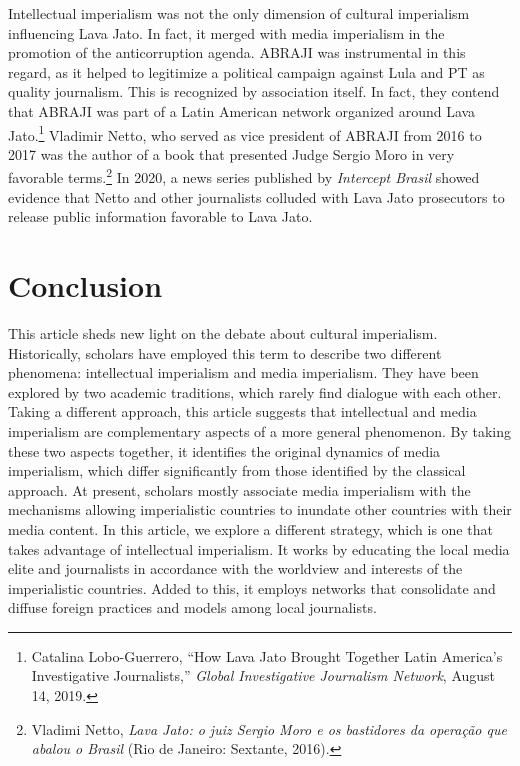 \documentclass{tufte-handout}
\begin{document}
Intellectual imperialism was not the only dimension of cultural
imperialism influencing Lava Jato. In fact, it merged with media
imperialism in the promotion of the anticorruption agenda. ABRAJI was
instrumental in this regard, as it helped to legitimize a political
campaign against Lula and PT as quality journalism. This is recognized
by association itself. In fact, they contend that ABRAJI was part of a
Latin American network organized around Lava Jato.\footnote{Catalina
  Lobo-Guerrero, ``How Lava Jato Brought Together Latin America's
  Investigative Journalists,'' \emph{Global Investigative Journalism
  Network}, August 14, 2019.} Vladimir Netto, who served as vice
president of ABRAJI from 2016 to 2017 was the author of a book that
presented Judge Sergio Moro in very favorable terms.\footnote{Vladimi
  Netto, \emph{Lava Jato: o juiz Sergio Moro e os bastidores da operação
  que abalou o Brasil} (Rio de Janeiro: Sextante, 2016).} In 2020, a
news series published by \emph{Intercept Brasil} showed evidence that
Netto and other journalists colluded with Lava Jato prosecutors to
release public information favorable to Lava Jato.

\hypertarget{conclusion}{%
\section{Conclusion}\label{conclusion}}

This article sheds new light on the debate about cultural imperialism.
Historically, scholars have employed this term to describe two different
phenomena: intellectual imperialism and media imperialism. They have
been explored by two academic traditions, which rarely find dialogue
with each other. Taking a different approach, this article suggests that
intellectual and media imperialism are complementary aspects of a more
general phenomenon. By taking these two aspects together, it identifies
the original dynamics of media imperialism, which differ significantly
from those identified by the classical approach. At present, scholars
mostly associate media imperialism with the mechanisms allowing
imperialistic countries to inundate other countries with their media
content. In this article, we explore a different strategy, which is one
that takes advantage of intellectual imperialism. It works by educating
the local media elite and journalists in accordance with the worldview
and interests of the imperialistic countries. Added to this, it employs
networks that consolidate and diffuse foreign practices and models among
local journalists.
\end{document}
